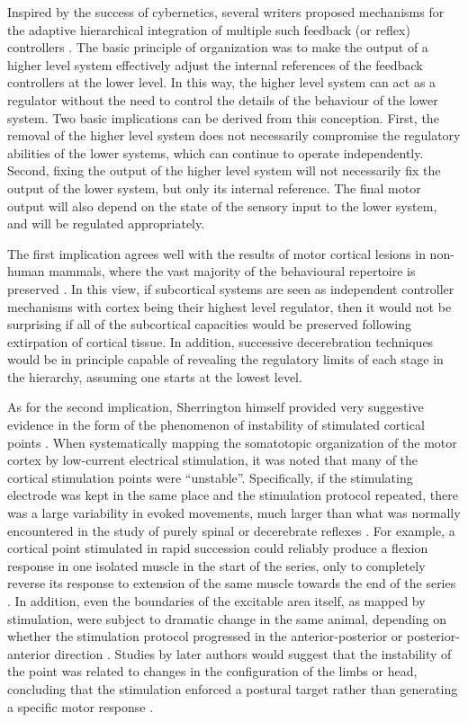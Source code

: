 Inspired by the success of cybernetics, several writers proposed mechanisms for the adaptive hierarchical integration of multiple such feedback (or reflex) controllers \cite{Powers1973}. The basic principle of organization was to make the output of a higher level system effectively adjust the internal references of the feedback controllers at the lower level. In this way, the higher level system can act as a regulator without the need to control the details of the behaviour of the lower system. Two basic implications can be derived from this conception. First, the removal of the higher level system does not necessarily compromise the regulatory abilities of the lower systems, which can continue to operate independently. Second, fixing the output of the higher level system will not necessarily fix the output of the lower system, but only its internal reference. The final motor output will also depend on the state of the sensory input to the lower system, and will be regulated appropriately.

The first implication agrees well with the results of motor cortical lesions in non-human mammals, where the vast majority of the behavioural repertoire is preserved \cite{Goltz1888,Leyton1917,Bjursten1976,Terry1989,Whishaw1991,Darling2011,Zaaimi2012,Kawai2015}. In this view, if subcortical systems are seen as independent controller mechanisms with cortex being their highest level regulator, then it would not be surprising if all of the subcortical capacities would be preserved following extirpation of cortical tissue. In addition, successive decerebration techniques would be in principle capable of revealing the regulatory limits of each stage in the hierarchy, assuming one starts at the lowest level.

As for the second implication, Sherrington himself provided very suggestive evidence in the form of the phenomenon of instability of stimulated cortical points \cite{GrahamBrown1912,Leyton1917}. When systematically mapping the somatotopic organization of the motor cortex by low-current electrical stimulation, it was noted that many of the cortical stimulation points were ``unstable''. Specifically, if the stimulating electrode was kept in the same place and the stimulation protocol repeated, there was a large variability in evoked movements, much larger than what was normally encountered in the study of purely spinal or decerebrate reflexes \cite{GrahamBrown1912}. For example, a cortical point stimulated in rapid succession could reliably produce a flexion response in one isolated muscle in the start of the series, only to completely reverse its response to extension of the same muscle towards the end of the series \cite{GrahamBrown1912}. In addition, even the boundaries of the excitable area itself, as mapped by stimulation, were subject to dramatic change in the same animal, depending on whether the stimulation protocol progressed in the anterior-posterior or posterior-anterior direction \cite{Leyton1917}. Studies by later authors would suggest that the instability of the point was related to changes in the configuration of the limbs or head, concluding that the stimulation enforced a postural target rather than generating a specific motor response \cite{Ward1938}.

